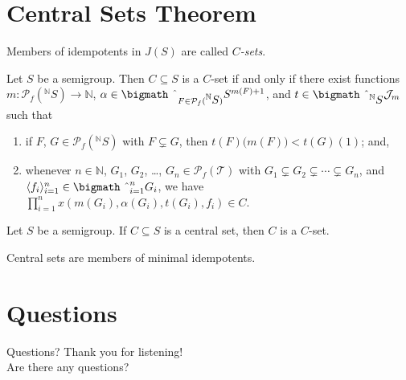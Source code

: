 \documentclass{beamer}
\newcommand{\la}{\langle}
\newcommand{\ra}{\rangle}
\newcommand{\bbN}{\mathbb{N}}
\newcommand{\calJ}{\mathcal{J}}
\newcommand{\calT}{\mathcal{T}}
\newcommand{\Pf}{\mathcal{P}_f}
\newcommand{\bigtimes}{\hbox{\bigmath \char'2}}
\begin{document}
\section{Central Sets Theorem}
\begin{frame}
  \begin{definition}
    Members of idempotents in $J(S)$ are called \textsl{$C$-sets}.
  \end{definition}
  
  \pause

  \begin{theorem}
    Let $S$ be a semigroup.
    Then $C \subseteq S$ is a $C$-set if and only if there exist
    functions $m \colon \Pf(\mbox{$^{\bbN}{S}$}) \to \bbN$, $\alpha
    \in \bigtimes_{F \in \Pf(\mbox{$^{\bbN}{S}$})} S^{m(F) + 1}$, and
    $t \in \bigtimes_{\mbox{$^{\bbN}{S}$}} \calJ_m$ such that 
    \pause
    \begin{enumerate}
      \item if $F$, $G \in \Pf(\mbox{$^{\bbN}{S}$})$ with $F \subsetneq
        G$, then $t(F)\bigl( m(F) \bigr) < t(G)(1)$; and,
        \pause
      
      \item whenever $n \in \bbN$, $G_1$, $G_2$, \ldots, $G_n
          \in \Pf(\calT)$ with $G_1 \subsetneq G_2 \subsetneq \cdots
          \subsetneq G_n$, and $\la f_i \ra_{i=1}^n \in
          \bigtimes_{i=1}^n G_i$, we have
          $\prod_{i=1}^n x(m(G_i), \alpha(G_i), t(G_i), f_i) \in C$. 
    \end{enumerate}
  \end{theorem}
\end{frame}

\begin{frame}
  \begin{theorem}
    Let $S$ be a semigroup.
    If $C \subseteq S$ is a central set, then $C$ is a $C$-set. 
  \end{theorem}

  \pause

  \begin{definition}
    Central sets are members of minimal idempotents.
  \end{definition}
\end{frame}

\section{Questions}
\begin{frame}
  \begin{block}{Questions?}
    Thank you for listening! \\
    Are there any questions?
  \end{block}
\end{frame}
\end{document}
